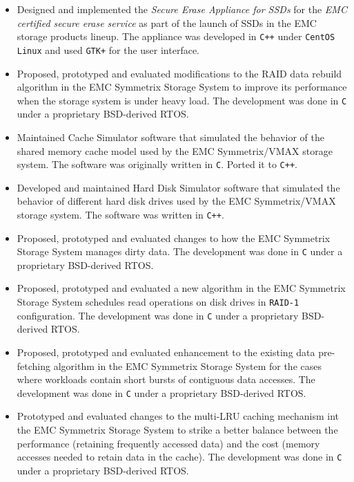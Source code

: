 \documentclass[10pt,a4paper,sans]{moderncv}
\begin{document}
{
	\begin{itemize}
		\item Designed and implemented the {\em Secure Erase Appliance for SSDs}
			for the {\em EMC certified secure erase service} as part of the
			launch of SSDs in the EMC storage products lineup. The appliance was
			developed in \texttt{C++} under \texttt{CentOS Linux} and used
			\texttt{GTK+} for the user interface.
		\item Proposed, prototyped and evaluated modifications to the RAID data rebuild algorithm
			in the EMC Symmetrix Storage System to improve its performance when
			the storage system is under heavy load. The
			development was done in \texttt{C} under a proprietary BSD-derived RTOS.
		\item Maintained Cache Simulator software that simulated the behavior of the
			shared memory cache model used by the EMC Symmetrix/VMAX storage system.
			The software was originally written in \texttt{C}. Ported it to \texttt{C++}.
		\item Developed and maintained Hard Disk Simulator software that
			simulated the behavior of different hard disk drives used by the
			EMC Symmetrix/VMAX storage system. The software was written in \texttt{C++}.
	\end{itemize}
}
{
	\begin{itemize}
		\item Proposed, prototyped and evaluated changes to how the EMC Symmetrix Storage System manages dirty data.
			The development was done in \texttt{C} under a proprietary BSD-derived RTOS.
		\item Proposed, prototyped and evaluated a new algorithm in the EMC Symmetrix Storage System schedules read
			operations on disk drives in \texttt{RAID-1} configuration.
			The development was done in \texttt{C} under a proprietary BSD-derived RTOS.
		\item Proposed, prototyped and evaluated enhancement to the existing data pre-fetching algorithm
			in the EMC Symmetrix Storage System for the cases where workloads contain short bursts of
			contiguous data accesses. The development was done in \texttt{C} under a proprietary BSD-derived RTOS.
		\item Prototyped and evaluated changes to the multi-LRU caching mechanism int the EMC Symmetrix Storage
			System to strike a better balance between the performance (retaining frequently accessed data) and the cost
			(memory accesses needed to retain data in the cache).
			The development was done in \texttt{C} under a proprietary BSD-derived RTOS.
	\end{itemize}
}
\end{document}
